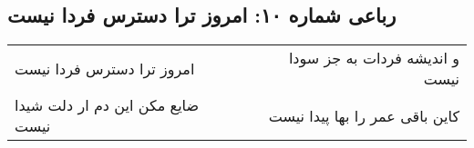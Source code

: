 \begin{center}
\section*{رباعی شماره ۱۰: امروز ترا دسترس فردا نیست}
\label{sec:sh010}
\begin{longtable}{l p{0.5cm} r}
امروز ترا دسترس فردا نیست
&&
و اندیشه فردات به جز سودا نیست
\\
ضایع مکن این دم ار دلت شیدا نیست
&&
کاین باقی عمر را بها پیدا نیست
\\
\end{longtable}
\end{center}
